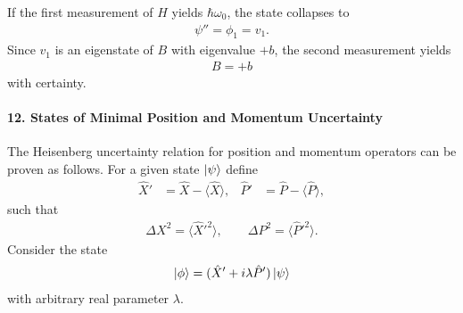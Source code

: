 \documentclass[11pt,a4paper]{scrartcl}
\begin{document}
\begin{enumerate}[label=(\alph*)]
\begin{calculationbox}
        If the first measurement of $H$ yields $\hbar\omega_0$, the state collapses to
        \begin{align*}
            \psi'' = \phi_1 = v_1.
        \end{align*}
        Since $v_1$ is an eigenstate of $B$ with eigenvalue $+b$, the second measurement yields
        \begin{align*}
            B = +b
        \end{align*}
        with certainty.
    \end{calculationbox}

\end{enumerate}

\paragraph{12. States of Minimal Position and Momentum Uncertainty}
The Heisenberg uncertainty relation for position and momentum operators can be proven as follows. For a given state $\ket{\psi}$ define
\begin{align*}
    \hat{X}' &= \hat{X} - \langle \hat{X} \rangle,
    &
    \hat{P}' &= \hat{P} - \langle \hat{P} \rangle,
\end{align*}
such that
\begin{align*}
    \Delta X^2 = \langle \hat{X}'^2 \rangle,
    \qquad
    \Delta P^2 = \langle \hat{P}'^2 \rangle.
\end{align*}
Consider the state
\begin{align*}
    \ket{\phi} = (\hat{X}' + i \lambda \hat{P}') \ket{\psi}
\end{align*}
with arbitrary real parameter $\lambda$.
\end{document}
